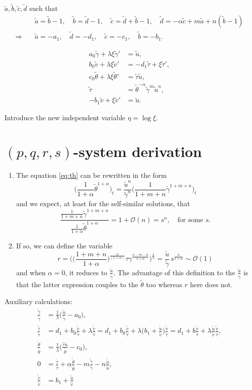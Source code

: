 \documentclass[a4paper,11pt]{article}
\def\tg{{\tilde{\gamma}}}
\def\tv{{\tilde{v}}}
\def\tth{{\tilde{\theta}}}
\def\ts{{\tilde{\tau}}}
\def\tu{{\tilde{u}}}
\def\dtg{\dot{\tilde{\gamma}}}
\def\dtv{\dot{\tilde{v}}}
\def\dtth{\dot{\tilde{\theta}}}
\def\dts{\dot{\tilde{\tau}}}
\def\dtu{\dot{\tilde{u}}}
\def\ta{{\tilde{a}}}
\def\tb{{\tilde{b}}}
\def\tc{{\tilde{c}}}
\def\td{{\tilde{d}}}
\begin{document}
$\ta, \tb, \tc, \td$ such that
\begin{align*}
 &\ta=\tb-1, \quad \tb=\td-1, \quad \tc=\td+\tb-1,\quad \td = -\alpha \tc + m\ta +n(\tb-1) \\
 \Longrightarrow \quad&\ta = -a_1, \quad \td = -d_1, \quad \tc = -c_1, \quad \tb=-b_1.
\end{align*}

\begin{equation}
 \begin{aligned}
  a_0\tg + \lambda\xi\tg' &=\tu,\\
  b_0\tv + \lambda\xi\tv' &=-d_1 \ts + \xi\ts',\\
  c_0\tth+ \lambda\xi\tth'&=\ts\tu,\\
  \ts &=\tth^{-\alpha}\tg^m\tu^n,\\
  -b_1\tv+\xi\tv' &= \tu.
 \end{aligned}
\end{equation}

Introduce the new independent variable $\eta = \log\xi$.
\section{$(p,q,r,s)$-system derivation}

\begin{enumerate}
 \item The equation \eqref{eq:th} can be rewritten in the form
 $$ \Big(\frac{1}{1+\alpha} \tth^{1+\alpha}\Big)_t = \frac{\tu^n}{\tg^n} \Big(\frac{1}{1+m+n} \tg^{1+m+n}\Big)_t$$
 and we expect, at least for the self-similar solutions, that
 $$ \frac{ \frac{1}{1+m+n} \tg^{1+m+n} }{ \frac{1}{1+\alpha} \tth^{1+\alpha} }  = 1 + \mathcal{O}(n) = s^n, \quad \text{for some $s$}. $$
 \item If so, we can define the variable 
 $$r = \Big(\Big(\frac{1+m+n}{1+\alpha}\Big)^{\frac{\alpha}{(1+\alpha)}}\tau \gamma^{\frac{\alpha-m-n}{1+\alpha}}\Big)^{\frac{1}{n}} = \frac{\tu}{\tg}\,s^{\frac{\alpha}{1+\alpha}} \sim \mathcal{O}(1) $$
 and when $\alpha=0$, it reduces to $\frac{\tu}{\tg}$. The advantage of this definition to the $\frac{\tu}{\tg}$ is that the latter expression couples to the $\tth$ too whereas $r$ here does not. 
\end{enumerate}

Auxiliary calculations:
\begin{align*}
 \frac{\dtg}{\tg} &= \frac{1}{\lambda }\Big(\frac{\tu}{\tg}-a_0\Big),\\
 \frac{\dts}{\ts} &= d_1+ b_0\frac{\tv}{\ts} + \lambda \frac{\dtv}{\ts} = d_1+ b_0\frac{\tv}{\ts} + \lambda \Big(b_1 + \frac{\tu}{\tv}\Big)\frac{\tv}{\ts} = d_1 + b\frac{\tv}{\ts} + \lambda\frac{\tu}{\tv}\frac{\tv}{\ts} ,\\
 \frac{\dtth}{\tth}&=\frac{1}{\lambda }\Big(\frac{\ts\tu}{\tth}-c_0\Big),\\
 0&=\frac{\dts}{\ts} +\alpha \frac{\dtth}{\tth} - m \frac{\dtg}{\tg} - n\frac{\dtu}{\tu},\\
 \frac{\dtv}{\tv}&= b_1 +\frac{\tu}{\tv}
\end{align*}
\end{document}
